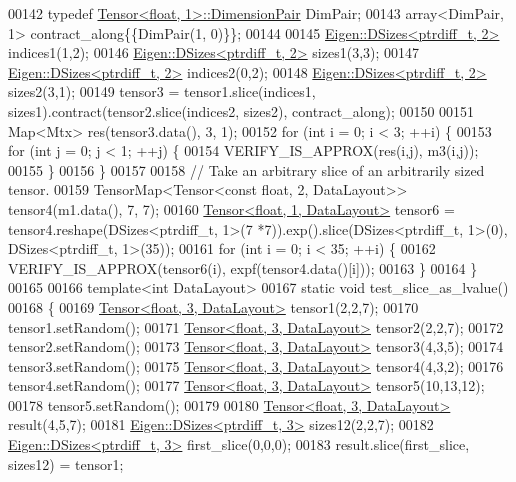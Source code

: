 \begin{DoxyCode}
00142   \textcolor{keyword}{typedef} \hyperlink{class_eigen_1_1_tensor}{Tensor<float, 1>::DimensionPair} DimPair;
00143   array<DimPair, 1> contract\_along\{\{DimPair(1, 0)\}\};
00144 
00145   \hyperlink{struct_eigen_1_1_d_sizes}{Eigen::DSizes<ptrdiff\_t, 2>} indices1(1,2);
00146   \hyperlink{struct_eigen_1_1_d_sizes}{Eigen::DSizes<ptrdiff\_t, 2>} sizes1(3,3);
00147   \hyperlink{struct_eigen_1_1_d_sizes}{Eigen::DSizes<ptrdiff\_t, 2>} indices2(0,2);
00148   \hyperlink{struct_eigen_1_1_d_sizes}{Eigen::DSizes<ptrdiff\_t, 2>} sizes2(3,1);
00149   tensor3 = tensor1.slice(indices1, sizes1).contract(tensor2.slice(indices2, sizes2), contract\_along);
00150 
00151   Map<Mtx> res(tensor3.data(), 3, 1);
00152   \textcolor{keywordflow}{for} (\textcolor{keywordtype}{int} i = 0; i < 3; ++i) \{
00153     \textcolor{keywordflow}{for} (\textcolor{keywordtype}{int} j = 0; j < 1; ++j) \{
00154       VERIFY\_IS\_APPROX(res(i,j), m3(i,j));
00155     \}
00156   \}
00157 
00158   \textcolor{comment}{// Take an arbitrary slice of an arbitrarily sized tensor.}
00159   TensorMap<Tensor<const float, 2, DataLayout>> tensor4(m1.data(), 7, 7);
00160   \hyperlink{class_eigen_1_1_tensor}{Tensor<float, 1, DataLayout>} tensor6 = tensor4.reshape(DSizes<ptrdiff\_t, 1>(7
      *7)).exp().slice(DSizes<ptrdiff\_t, 1>(0), DSizes<ptrdiff\_t, 1>(35));
00161   \textcolor{keywordflow}{for} (\textcolor{keywordtype}{int} i = 0; i < 35; ++i) \{
00162     VERIFY\_IS\_APPROX(tensor6(i), expf(tensor4.data()[i]));
00163   \}
00164 \}
00165 
00166 \textcolor{keyword}{template}<\textcolor{keywordtype}{int} DataLayout>
00167 \textcolor{keyword}{static} \textcolor{keywordtype}{void} test\_slice\_as\_lvalue()
00168 \{
00169   \hyperlink{class_eigen_1_1_tensor}{Tensor<float, 3, DataLayout>} tensor1(2,2,7);
00170   tensor1.setRandom();
00171   \hyperlink{class_eigen_1_1_tensor}{Tensor<float, 3, DataLayout>} tensor2(2,2,7);
00172   tensor2.setRandom();
00173   \hyperlink{class_eigen_1_1_tensor}{Tensor<float, 3, DataLayout>} tensor3(4,3,5);
00174   tensor3.setRandom();
00175   \hyperlink{class_eigen_1_1_tensor}{Tensor<float, 3, DataLayout>} tensor4(4,3,2);
00176   tensor4.setRandom();
00177   \hyperlink{class_eigen_1_1_tensor}{Tensor<float, 3, DataLayout>} tensor5(10,13,12);
00178   tensor5.setRandom();
00179 
00180   \hyperlink{class_eigen_1_1_tensor}{Tensor<float, 3, DataLayout>} result(4,5,7);
00181   \hyperlink{struct_eigen_1_1_d_sizes}{Eigen::DSizes<ptrdiff\_t, 3>} sizes12(2,2,7);
00182   \hyperlink{struct_eigen_1_1_d_sizes}{Eigen::DSizes<ptrdiff\_t, 3>} first\_slice(0,0,0);
00183   result.slice(first\_slice, sizes12) = tensor1;

\end{DoxyCode}
